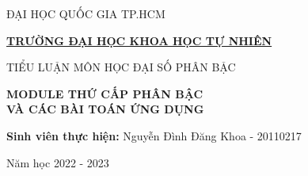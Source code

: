 
\newcommand\nbvspace[1][3]{\vspace*{\stretch{#1}}}
\newcommand\nbstretchyspace{\spaceskip0.5em plus 0.25em minus 0.25em}
\newcommand{\nbtitlestretch}{\spaceskip0.6em}
\thispagestyle{empty}
\begin{tcolorbox}
    \begin{center}

        \vspace{1.2cm}
        \centerline{ĐẠI HỌC QUỐC GIA TP.HCM}
        \centerline{\bf\underline{TRƯỜNG ĐẠI HỌC KHOA HỌC TỰ NHIÊN}}
        \vspace{2.5cm}

        \Large TIỂU LUẬN MÔN HỌC ĐẠI SỐ PHÂN BẬC

        \vspace{5cm}

        {\huge\textbf{
                MODULE THỨ CẤP PHÂN BẬC\\[4mm]VÀ CÁC BÀI TOÁN ỨNG DỤNG}}

        \normalsize

        \vspace{3.5cm}


        {\large\textbf{Sinh viên thực hiện:} Nguyễn Đình Đăng Khoa - 20110217}

        \normalsize

        \vspace{6.5cm}
        \vfill
        Năm học 2022 - 2023

        \vspace{1.5cm}

    \end{center}
\end{tcolorbox}

\pagebreak
\clearpage
\restoregeometry
